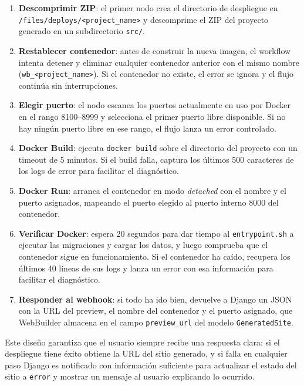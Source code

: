 \begin{enumerate}
    \item \textbf{Descomprimir ZIP}: el primer nodo crea el directorio de despliegue en \\ \texttt{/files/deploys/<project\_name>} y descomprime el ZIP del proyecto generado en un subdirectorio \texttt{src/}.
    \item \textbf{Restablecer contenedor}: antes de construir la nueva imagen, el workflow intenta detener y eliminar cualquier contenedor anterior con el mismo nombre (\texttt{wb\_<project\_name>}). Si el contenedor no existe, el error se ignora y el flujo continúa sin interrupciones.
    
    \item \textbf{Elegir puerto}: el nodo escanea los puertos actualmente en uso por Docker en el rango 8100--8999 y selecciona el primer puerto libre disponible. Si no hay ningún puerto libre en ese rango, el flujo lanza un error controlado.
    
    \item \textbf{Docker Build}: ejecuta \texttt{docker build} sobre el directorio del proyecto con un timeout de 5 minutos. Si el build falla, captura los últimos 500 caracteres de los logs de error para facilitar el diagnóstico.
    
    \item \textbf{Docker Run}: arranca el contenedor en modo \emph{detached} con el nombre y el puerto asignados, mapeando el puerto elegido al puerto interno 8000 del contenedor.
    
    \item \textbf{Verificar Docker}: espera 20 segundos para dar tiempo al \texttt{entrypoint.sh} a ejecutar las migraciones y cargar los datos, y luego comprueba que el contenedor sigue en funcionamiento. Si el contenedor ha caído, recupera los últimos 40 líneas de sus logs y lanza un error con esa información para facilitar el diagnóstico.

    \item \textbf{Responder al webhook}: si todo ha ido bien, devuelve a Django un JSON con la URL del preview, el nombre del contenedor y el puerto asignado, que WebBuilder almacena en el campo \texttt{preview\_url} del modelo \texttt{GeneratedSite}.
\end{enumerate}

Este diseño garantiza que el usuario siempre recibe una respuesta clara: si el despliegue tiene éxito obtiene la URL del sitio generado, y si falla en cualquier paso Django es notificado con información suficiente para actualizar el estado del sitio a \texttt{error} y mostrar un mensaje al usuario explicando lo ocurrido.


